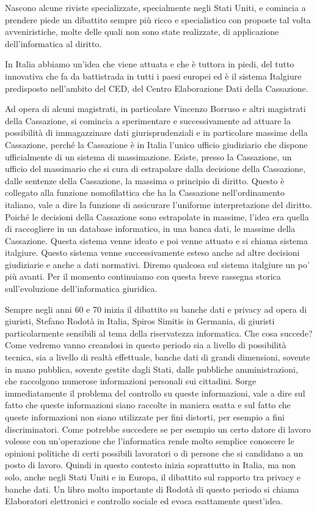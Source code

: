 Nascono alcune riviste specializzate, specialmente negli Stati Uniti, e comincia a prendere piede un dibattito sempre più ricco e specialistico con proposte tal volta avveniristiche, molte delle quali non sono state realizzate, di applicazione dell'informatica al diritto. 

In Italia abbiamo un'idea che viene attuata e che è tuttora in piedi, del tutto innovativa che fa da battistrada in tutti i paesi europei ed è il sistema Italgiure predisposto nell'ambito del CED, del Centro Elaborazione Dati della Cassazione. 

Ad opera di alcuni magistrati, in particolare Vincenzo Borruso e altri magistrati della Cassazione, si comincia a sperimentare e successivamente ad attuare la possibilità di immagazzinare dati giurisprudenziali e in particolare massime della Cassazione, perché la Cassazione è in Italia l'unico ufficio giudiziario che dispone ufficialmente di un sistema di massimazione. Esiste, presso la Cassazione, un ufficio del massimario che si cura di estrapolare dalla decisione della Cassazione, dalle sentenze della Cassazione, la massima o principio di diritto. Questo è collegato alla funzione nomofilattica che ha la Cassazione nell'ordinamento italiano, vale a dire la funzione di assicurare l'uniforme interpretazione del diritto. Poiché le decisioni della Cassazione sono estrapolate in massime, l'idea era quella di raccogliere in un database informatico, in una banca dati, le massime della Cassazione. Questa sistema venne ideato e poi venne attuato e si chiama sistema italgiure. Questo sistema venne successivamente esteso anche ad altre decisioni giudiziarie e anche a dati normativi. Diremo qualcosa sul sistema italgiure un po' più avanti. Per il momento continuiamo con questa breve rassegna storica sull'evoluzione dell'informatica giuridica.

Sempre negli anni 60 e 70 inizia il dibattito su banche dati e privacy ad opera di giuristi, Stefano Rodotà in Italia, Spiros Simitis in Germania, di giuristi particolarmente sensibili al tema della riservatezza informatica. Che cosa succede? Come vedremo vanno creandosi in questo periodo sia a livello di possibilità tecnica, sia a livello di realtà effettuale, banche dati di grandi dimensioni, sovente in mano pubblica, sovente gestite dagli Stati, dalle pubbliche amministrazioni, che raccolgono numerose informazioni personali sui cittadini. Sorge immediatamente il problema del controllo su queste informazioni, vale a dire sul fatto che queste informazioni siano raccolte in maniera esatta e sul fatto che queste informazioni non siano utilizzate per fini distorti, per esempio a fini discriminatori. Come potrebbe succedere se per esempio un certo datore di lavoro volesse con un'operazione che l'informatica rende molto semplice conoscere le opinioni politiche di certi possibili lavoratori o di persone che si candidano a un posto di lavoro. Quindi in questo contesto inizia soprattutto in Italia, ma non solo, anche negli Stati Uniti e in Europa, il dibattito sul rapporto tra privacy e banche dati. Un libro molto importante di Rodotà di questo periodo si chiama Elaboratori elettronici e controllo sociale ed evoca esattamente quest'idea.

